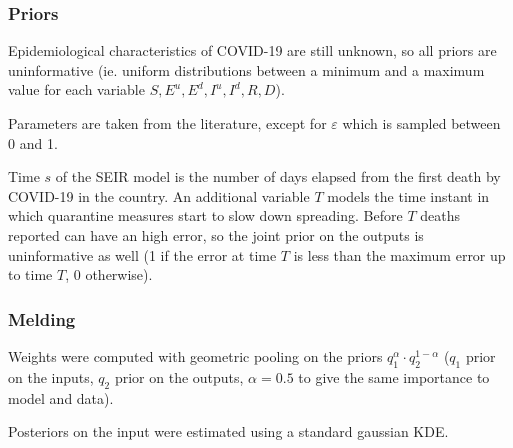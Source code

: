 \documentclass[aspectratio=43]{beamer}
\begin{document}
\begin{frame}
	\frametitle{Priors}
	Epidemiological characteristics of COVID-19 are still unknown, so all priors are uninformative (ie. uniform distributions between a minimum and a maximum value for each variable $S, E^u, E^d, I^u, I^d, R, D$).
	
	Parameters are taken from the literature, except for $\varepsilon$ which is sampled between 0 and 1.
	
	Time $s$ of the SEIR model is the number of days elapsed from the first death by COVID-19 in the country. An additional variable $T$ models the time instant in which quarantine measures start to slow down spreading. Before $T$ deaths reported can have an high error, so the joint prior on the outputs is uninformative as well (1 if the error at time $T$ is less than the maximum error up to time $T$, 0 otherwise).
\end{frame}

\begin{frame}
	\frametitle{Melding}
	Weights were computed with geometric pooling on the priors $q_1^\alpha \cdot q_2^{1-\alpha}$ ($q_1$ prior on the inputs, $q_2$ prior on the outputs, $\alpha = 0.5$ to give the same importance to model and data).
	
	Posteriors on the input were estimated using a standard gaussian KDE.
\end{frame}
\end{document}
